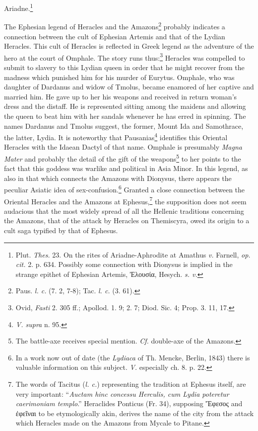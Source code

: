 \documentclass[a4paper, 12pt, oneside]{article}
\begin{document}
Ariadne.\footnote{Plut. \emph{Thes.} 23. On the rites of Ariadne-Aphrodite at Amathus \emph{v.} Farnell, \emph{op. cit.} 2. p. 634. Possibly some connection with Dionysus is implied in the strange epithet of Ephesian Artemis, Ἐλουσία, Hesych. \emph{s. v.}}

The Ephesian legend of Heracles and the Amazons\footnote{Paus. \emph{l. c.} (7. 2, 7-8); Tac. \emph{l. c.} (3. 61).} probably indicates a connection between the cult of Ephesian Artemis and that of the Lydian Heracles. This cult of Heracles is reflected in Greek legend as the adventure of the hero at the court of Omphale. The story runs thus:\footnote{Ovid, \emph{Fasti} 2. 305 ff.; Apollod. 1. 9; 2. 7; Diod. Sic. 4; Prop. 3. 11, 17.} Heracles was compelled to submit to slavery to this Lydian queen in order that he might recover from the madness which punished him for his murder of Eurytus. Omphale, who was daughter of Dardanus and widow of Tmolus, became enamored of her captive and married him. He gave up to her his weapons and received in return woman's dress and the distaff. He is represented sitting among the maidens and allowing the queen to beat him with her sandals whenever he has erred in spinning. The names Dardanus and Tmolus suggest, the former, Mount Ida and Samothrace, the latter, Lydia. It is noteworthy that Pausanias\footnote{\emph{V. supra} n. 95.} identifies this Oriental Heracles with the Idaean Dactyl of that name. Omphale is presumably \emph{Magna Mater} and probably the detail of the gift of the weapons\footnote{The battle-axe receives special mention. \emph{Cf.} double-axe of the Amazons.} to her points to the fact that this goddess was warlike and political in Asia Minor. In this legend, as also in that which connects the Amazons with Dionysus, there appears the peculiar Asiatic idea of sex-confusion.\footnote{In a work now out of date (the \emph{Lydiaca} of Th. Mencke, Berlin, 1843) there is valuable information on this subject. \emph{V.} especially ch. 8. p. 22.} Granted a close connection between the Oriental Heracles and the Amazons at Ephesus,\footnote{The words of Tacitus (\emph{l. c.}) representing the tradition at Ephesus itself, are very important: ``\emph{Auctam hinc concessu Herculis, cum Lydia poteretur caerimoniam templo}.'' Heraclides Ponticus (Fr. 34), supposing Ἔφεσος and ἐφεῖναι to be etymologically akin, derives the name of the city from the attack which Heracles made on the Amazons from Mycale to Pitane.} the supposition does not seem audacious that the most widely spread of all the Hellenic traditions concerning the Amazons, that of the attack by Heracles on Themiscyra, owed its origin to a cult saga typified by that of Ephesus.
\end{document}
